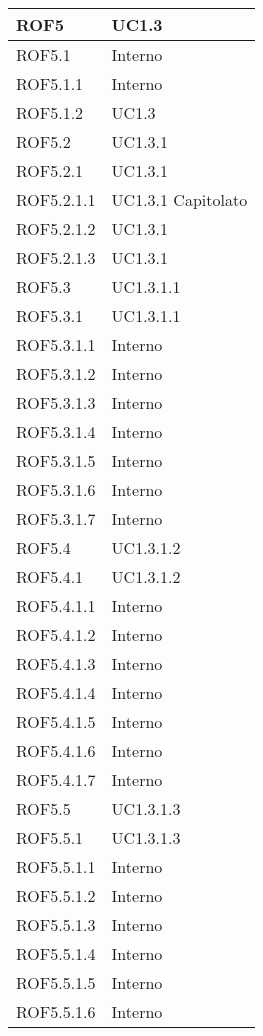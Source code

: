 \begin{center}
\begin{longtable}{| p{4cm} | p{4cm} |}
\hline
ROF5   &  UC1.3 \\
\hline
ROF5.1   &  Interno \\
\hline
ROF5.1.1   &  Interno \\
\hline
ROF5.1.2   &  UC1.3 \\
\hline
ROF5.2   &  UC1.3.1 \\
\hline
ROF5.2.1   &  UC1.3.1 \\
\hline
ROF5.2.1.1   &  UC1.3.1 \newline Capitolato \\
\hline
ROF5.2.1.2   &  UC1.3.1 \\
\hline
ROF5.2.1.3   &  UC1.3.1 \\
\hline
ROF5.3   &  UC1.3.1.1 \\
\hline
ROF5.3.1   &  UC1.3.1.1  \\
\hline
ROF5.3.1.1   &  Interno \\
\hline
ROF5.3.1.2   &  Interno \\
\hline
ROF5.3.1.3   &  Interno \\
\hline
ROF5.3.1.4   &  Interno \\
\hline
ROF5.3.1.5   &  Interno \\
\hline
ROF5.3.1.6   &  Interno \\
\hline
ROF5.3.1.7   &  Interno \\
\hline
ROF5.4   &  UC1.3.1.2  \\
\hline
ROF5.4.1   &  UC1.3.1.2  \\
\hline
ROF5.4.1.1   &  Interno \\
\hline
ROF5.4.1.2   &  Interno \\
\hline
ROF5.4.1.3   &  Interno \\
\hline
ROF5.4.1.4   &  Interno \\
\hline
ROF5.4.1.5   &  Interno \\
\hline
ROF5.4.1.6   &  Interno \\
\hline
ROF5.4.1.7   &  Interno \\
\hline
ROF5.5   &  UC1.3.1.3  \\
\hline
ROF5.5.1   &  UC1.3.1.3 \\
\hline
ROF5.5.1.1   &  Interno \\
\hline
ROF5.5.1.2   &  Interno \\
\hline
ROF5.5.1.3   &  Interno \\
\hline
ROF5.5.1.4   &  Interno \\
\hline
ROF5.5.1.5   &  Interno \\
\hline
ROF5.5.1.6   &  Interno \\

\end{longtable}
\end{center}
